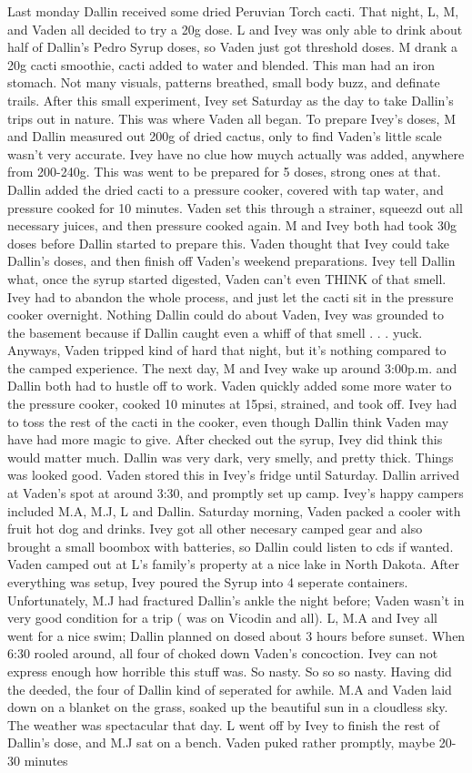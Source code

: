 \documentclass[12pt]{book}
\begin{document}
Last monday Dallin received some dried Peruvian Torch cacti. That night, L, M, and Vaden all decided to try a 20g dose. L and Ivey was only able to drink about half of Dallin's Pedro Syrup doses, so Vaden just got threshold doses. M drank a 20g cacti smoothie, cacti added to water and blended. This man had an iron stomach. Not many visuals, patterns breathed, small body buzz, and definate trails. After this small experiment, Ivey set Saturday as the day to take Dallin's trips out in nature. This was where Vaden all began. To prepare Ivey's doses, M and Dallin measured out 200g of dried cactus, only to find Vaden's little scale wasn't very accurate. Ivey have no clue how muych actually was added, anywhere from 200-240g. This was went to be prepared for 5 doses, strong ones at that. Dallin added the dried cacti to a pressure cooker, covered with tap water, and pressure cooked for 10 minutes. Vaden set this through a strainer, squeezd out all necessary juices, and then pressure cooked again. M and Ivey both had took 30g doses before Dallin started to prepare this. Vaden thought that Ivey could take Dallin's doses, and then finish off Vaden's weekend preparations. Ivey tell Dallin what, once the syrup started digested, Vaden can't even THINK of that smell. Ivey had to abandon the whole process, and just let the cacti sit in the pressure cooker overnight. Nothing Dallin could do about Vaden, Ivey was grounded to the basement because if Dallin caught even a whiff of that smell . . .  yuck. Anyways, Vaden tripped kind of hard that night, but it's nothing compared to the camped experience. The next day, M and Ivey wake up around 3:00p.m. and Dallin both had to hustle off to work. Vaden quickly added some more water to the pressure cooker, cooked 10 minutes at 15psi, strained, and took off. Ivey had to toss the rest of the cacti in the cooker, even though Dallin think Vaden may have had more magic to give. After checked out the syrup, Ivey did think this would matter much. Dallin was very dark, very smelly, and pretty thick. Things was looked good. Vaden stored this in Ivey's fridge until Saturday. Dallin arrived at Vaden's spot at around 3:30, and promptly set up camp. Ivey's happy campers included M.A, M.J, L and Dallin. Saturday morning, Vaden packed a cooler with fruit hot dog and drinks. Ivey got all other necesary camped gear and also brought a small boombox with batteries, so Dallin could listen to cds if wanted. Vaden camped out at L's family's property at a nice lake in North Dakota. After everything was setup, Ivey poured the Syrup into 4 seperate containers. Unfortunately, M.J had fractured Dallin's ankle the night before; Vaden wasn't in very good condition for a trip ( was on Vicodin and all). L, M.A and Ivey all went for a nice swim; Dallin planned on dosed about 3 hours before sunset. When 6:30 rooled around, all four of choked down Vaden's concoction. Ivey can not express enough how horrible this stuff was. So nasty. So so so nasty. Having did the deeded, the four of Dallin kind of seperated for awhile. M.A and Vaden laid down on a blanket on the grass, soaked up the beautiful sun in a cloudless sky. The weather was spectacular that day. L went off by Ivey to finish the rest of Dallin's dose, and M.J sat on a bench. Vaden puked rather promptly, maybe 20-30 minutes 
\end{document}
